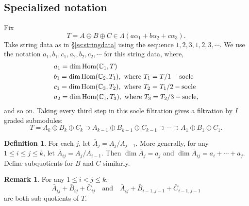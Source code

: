 \documentclass{amsart}
\numberwithin{equation}{section}
\numberwithin{figure}{section}
\numberwithin{table}{section}
\theoremstyle{definition}
\newtheorem{Definition}[equation]{Definition}
\newtheorem{Remark}[equation]{Remark}
\newcommand{\Hom}{\text{Hom}}
\begin{document}
\subsection{Specialized notation}

Fix $$T =A \oplus B \oplus C \in \Lambda(a\alpha_1+b\alpha_2+c\alpha_3).$$ 
Take string data as in \S\ref{ss:stringdata} using the sequence $1,2,3,1,2,3, \cdots$. We use the notation $a_1,b_1,c_1,a_2,b_2,c_2, \cdots$ for this string data, where,
$$
\begin{aligned} 
& a_1 = \dim \Hom ({\Bbb C}_1, T) \qquad  \qquad  \mbox{} \\
&b_1 = \dim \Hom ({\Bbb C}_2, T_1 ), \text{ where } T_1= T/1-\text{socle}\\
&c_1 = \dim \Hom ({\Bbb C}_3, T_2 ), \text{ where } T_2= T_1/2-\text{socle}\\
&a_2 = \dim \Hom ({\Bbb C}_1, T_3 ), \text{ where } T_3= T_2/3-\text{socle},
\end{aligned}
$$
and so on. 
Taking every third step in this socle filtration gives a filtration by $I$ graded submodules:
$$T= A_k \oplus B_k \oplus C_k \supset A_{k-1} \oplus B_{k-1} \oplus C_{k-1}  \supset \cdots \supset A_{1} \oplus B_{1} \oplus C_{1}.$$

\begin{Definition}
For each $j$, let $\bar A_j = A_j/A_{j-1}$. More generally, for any $1 \leq i\leq j \leq k$, let $\bar A_{ij} = A_j/A_{i-1}$. Then $\dim \bar A_j = a_j$ and $\dim \overline A_{ij}= a_i+ \cdots+ a_j$. Define subquotients for $B$ and $C$ similarly.
\end{Definition}

\begin{Remark} \label{sub-quotients}
For any $1 \leq i<j \leq k$, 
$$\bar A_{ij}+\bar B_{ij}+\bar C_{ij} \quad \text{and} \quad \bar A_{ij}+\bar B_{i-1,j-1}+\bar C_{i-1,j-1} $$ 
are both sub-quotients of $T$. 
\end{Remark}
\end{document}
